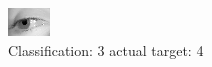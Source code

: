 \begin{figure}[h!]
\begin{center}
\includegraphics[width=0.60\columnwidth]{figures/ID2888_class_3_target_4.png}
\end{center}
\caption{ Classification: 3 actual target: 4}
\label{fig:ID2888_class_3_target_4}
\end{figure}
